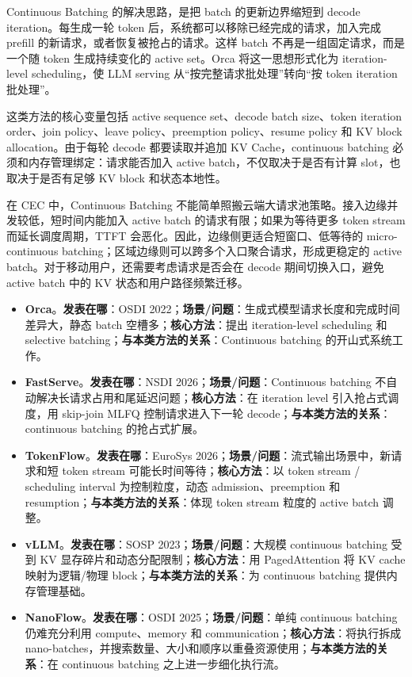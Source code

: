 \documentclass[a4paper,twocolumn,10pt]{ctexart}
\begin{document}
Continuous Batching 的解决思路，是把 batch 的更新边界缩短到 decode iteration。每生成一轮 token 后，系统都可以移除已经完成的请求，加入完成 prefill 的新请求，或者恢复被抢占的请求。这样 batch 不再是一组固定请求，而是一个随 token 生成持续变化的 active set。Orca 将这一思想形式化为 iteration-level scheduling，使 LLM serving 从“按完整请求批处理”转向“按 token iteration 批处理”。


这类方法的核心变量包括 active sequence set、decode batch size、token iteration order、join policy、leave policy、preemption policy、resume policy 和 KV block allocation。由于每轮 decode 都要读取并追加 KV Cache，continuous batching 必须和内存管理绑定：请求能否加入 active batch，不仅取决于是否有计算 slot，也取决于是否有足够 KV block 和状态本地性。


在 CEC 中，Continuous Batching 不能简单照搬云端大请求池策略。接入边缘并发较低，短时间内能加入 active batch 的请求有限；如果为等待更多 token stream 而延长调度周期，TTFT 会恶化。因此，边缘侧更适合短窗口、低等待的 micro-continuous batching；区域边缘则可以跨多个入口聚合请求，形成更稳定的 active batch。对于移动用户，还需要考虑请求是否会在 decode 期间切换入口，避免 active batch 中的 KV 状态和用户路径频繁迁移。



\begin{itemize}
\item \textbf{Orca}。\textbf{发表在哪}：OSDI 2022；\textbf{场景/问题}：生成式模型请求长度和完成时间差异大，静态 batch 空槽多；\textbf{核心方法}：提出 iteration-level scheduling 和 selective batching；\textbf{与本类方法的关系}：Continuous batching 的开山式系统工作。
\item \textbf{FastServe}。\textbf{发表在哪}：NSDI 2026；\textbf{场景/问题}：Continuous batching 不自动解决长请求占用和尾延迟问题；\textbf{核心方法}：在 iteration level 引入抢占式调度，用 skip-join MLFQ 控制请求进入下一轮 decode；\textbf{与本类方法的关系}：continuous batching 的抢占式扩展。
\item \textbf{TokenFlow}。\textbf{发表在哪}：EuroSys 2026；\textbf{场景/问题}：流式输出场景中，新请求和短 token stream 可能长时间等待；\textbf{核心方法}：以 token stream / scheduling interval 为控制粒度，动态 admission、preemption 和 resumption；\textbf{与本类方法的关系}：体现 token stream 粒度的 active batch 调整。
\item \textbf{vLLM}。\textbf{发表在哪}：SOSP 2023；\textbf{场景/问题}：大规模 continuous batching 受到 KV 显存碎片和动态分配限制；\textbf{核心方法}：用 PagedAttention 将 KV cache 映射为逻辑/物理 block；\textbf{与本类方法的关系}：为 continuous batching 提供内存管理基础。
\item \textbf{NanoFlow}。\textbf{发表在哪}：OSDI 2025；\textbf{场景/问题}：单纯 continuous batching 仍难充分利用 compute、memory 和 communication；\textbf{核心方法}：将执行拆成 nano-batches，并搜索数量、大小和顺序以重叠资源使用；\textbf{与本类方法的关系}：在 continuous batching 之上进一步细化执行流。
\end{itemize}
\end{document}
